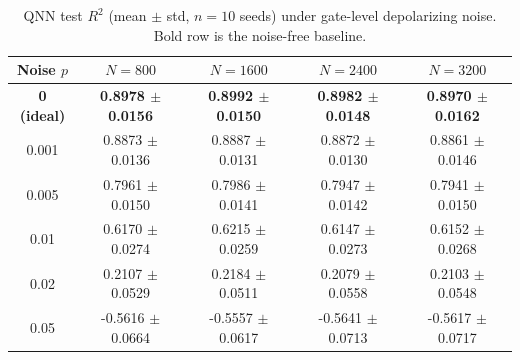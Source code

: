 \begin{table}[htbp]
\centering
\caption{QNN test $R^2$ (mean $\pm$ std, $n=10$ seeds) under gate-level depolarizing noise. Bold row is the noise-free baseline.}
\label{tab:noise_robustness}
\begin{tabular}{ccccc}
\toprule
Noise $p$ & $N=800$ & $N=1600$ & $N=2400$ & $N=3200$ \\
\midrule
\textbf{0 (ideal)} & \textbf{0.8978 $\pm$ 0.0156} & \textbf{0.8992 $\pm$ 0.0150} & \textbf{0.8982 $\pm$ 0.0148} & \textbf{0.8970 $\pm$ 0.0162} \\
0.001 & 0.8873 $\pm$ 0.0136 & 0.8887 $\pm$ 0.0131 & 0.8872 $\pm$ 0.0130 & 0.8861 $\pm$ 0.0146 \\
0.005 & 0.7961 $\pm$ 0.0150 & 0.7986 $\pm$ 0.0141 & 0.7947 $\pm$ 0.0142 & 0.7941 $\pm$ 0.0150 \\
0.01 & 0.6170 $\pm$ 0.0274 & 0.6215 $\pm$ 0.0259 & 0.6147 $\pm$ 0.0273 & 0.6152 $\pm$ 0.0268 \\
0.02 & 0.2107 $\pm$ 0.0529 & 0.2184 $\pm$ 0.0511 & 0.2079 $\pm$ 0.0558 & 0.2103 $\pm$ 0.0548 \\
0.05 & -0.5616 $\pm$ 0.0664 & -0.5557 $\pm$ 0.0617 & -0.5641 $\pm$ 0.0713 & -0.5617 $\pm$ 0.0717 \\
\bottomrule
\end{tabular}
\end{table}